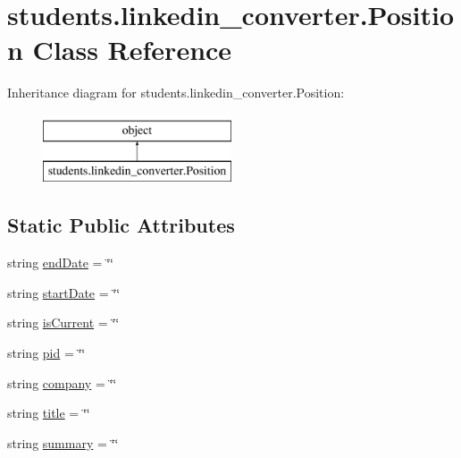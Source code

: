 \hypertarget{classstudents_1_1linkedin__converter_1_1_position}{\section{students.\-linkedin\-\_\-converter.\-Position Class Reference}
\label{classstudents_1_1linkedin__converter_1_1_position}
}
Inheritance diagram for students.\-linkedin\-\_\-converter.\-Position\-:\begin{figure}[H]
\begin{center}
\leavevmode
\includegraphics[height=2.000000cm]{classstudents_1_1linkedin__converter_1_1_position}
\end{center}
\end{figure}
\subsection*{Static Public Attributes}
\begin{DoxyCompactItemize}
\item 
string \hyperlink{classstudents_1_1linkedin__converter_1_1_position_ab8f28f8c86b50b641ffcdd18d3f7ada0}{end\-Date} = \char`\"{}\char`\"{}
\item 
string \hyperlink{classstudents_1_1linkedin__converter_1_1_position_ac6b8e26d676d6bf6c15c51012da90b85}{start\-Date} = \char`\"{}\char`\"{}
\item 
string \hyperlink{classstudents_1_1linkedin__converter_1_1_position_adac50b99cf25ff1739c0ef8e47790513}{is\-Current} = \char`\"{}\char`\"{}
\item 
string \hyperlink{classstudents_1_1linkedin__converter_1_1_position_abe1e57418151824f223a6df106bad11d}{pid} = \char`\"{}\char`\"{}
\item 
string \hyperlink{classstudents_1_1linkedin__converter_1_1_position_a4f0acf8538a488daedd9091f7f86dc8c}{company} = \char`\"{}\char`\"{}
\item 
string \hyperlink{classstudents_1_1linkedin__converter_1_1_position_a63ef787690c1859c3cb6ca8c18899c94}{title} = \char`\"{}\char`\"{}
\item 
string \hyperlink{classstudents_1_1linkedin__converter_1_1_position_a99344e54d4a5f380c7a224b440e3712e}{summary} = \char`\"{}\char`\"{}
\end{DoxyCompactItemize}


